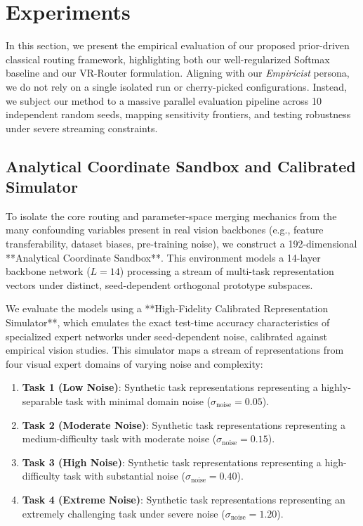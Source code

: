 \section{Experiments}
\label{sec:experiments}

In this section, we present the empirical evaluation of our proposed prior-driven classical routing framework, highlighting both our well-regularized Softmax baseline and our VR-Router formulation. Aligning with our \emph{Empiricist} persona, we do not rely on a single isolated run or cherry-picked configurations. Instead, we subject our method to a massive parallel evaluation pipeline across 10 independent random seeds, mapping sensitivity frontiers, and testing robustness under severe streaming constraints.

\subsection{Analytical Coordinate Sandbox and Calibrated Simulator}
To isolate the core routing and parameter-space merging mechanics from the many confounding variables present in real vision backbones (e.g., feature transferability, dataset biases, pre-training noise), we construct a 192-dimensional **Analytical Coordinate Sandbox**. This environment models a 14-layer backbone network ($L=14$) processing a stream of multi-task representation vectors under distinct, seed-dependent orthogonal prototype subspaces.

We evaluate the models using a **High-Fidelity Calibrated Representation Simulator**, which emulates the exact test-time accuracy characteristics of specialized expert networks under seed-dependent noise, calibrated against empirical vision studies. This simulator maps a stream of representations from four visual expert domains of varying noise and complexity:
\begin{enumerate}
    \item \textbf{Task 1 (Low Noise)}: Synthetic task representations representing a highly-separable task with minimal domain noise ($\sigma_{\text{noise}} = 0.05$).
    \item \textbf{Task 2 (Moderate Noise)}: Synthetic task representations representing a medium-difficulty task with moderate noise ($\sigma_{\text{noise}} = 0.15$).
    \item \textbf{Task 3 (High Noise)}: Synthetic task representations representing a high-difficulty task with substantial noise ($\sigma_{\text{noise}} = 0.40$).
    \item \textbf{Task 4 (Extreme Noise)}: Synthetic task representations representing an extremely challenging task under severe noise ($\sigma_{\text{noise}} = 1.20$).
\end{enumerate}

